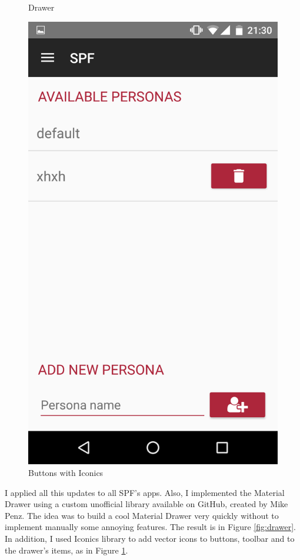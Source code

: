 \begin{figure}[thpb]
\begin{minipage}[b]{0.4\textwidth}
	\caption{Drawer}
	\label{fig:drawer}
\end{minipage}
\hfill
\begin{minipage}[b]{0.4\textwidth}
	\centering
	\includegraphics[scale=0.1]{./images/chap3/bottom_iconics.png}
	\caption{Buttons with Iconics}
	\label{fig:buttom-iconics}
\end{minipage}	
\end{figure}	

I applied all this updates to all SPF's apps. Also, I implemented the Material Drawer using a custom unofficial library available on GitHub, created by Mike Penz. The idea was to build a cool Material Drawer very quickly without to implement manually some annoying features. The result is in Figure \ref{fig:drawer}. In addition, I used Iconics library to add vector icons to buttons, toolbar and to the drawer's items, as in Figure \ref{fig:buttom-iconics}.

